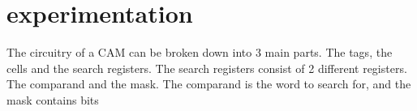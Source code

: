 \section{experimentation}
The circuitry of a CAM can be broken down into 3 main parts. The tags, the cells and the search registers. 
The search registers consist of 2 different registers. 
The comparand and the mask. The comparand is the word to search for, and the mask contains bits